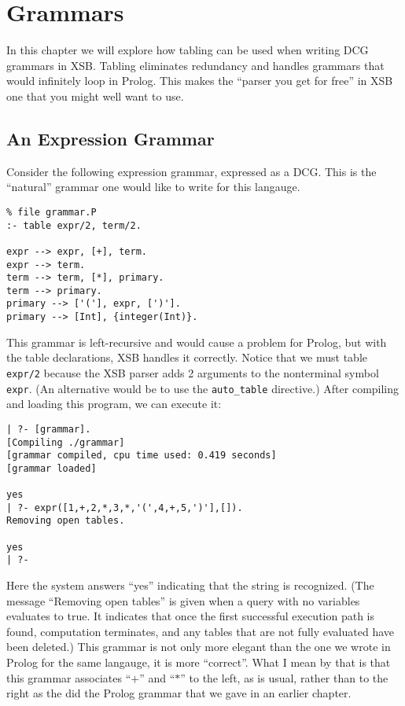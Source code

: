  \chapter{Grammars}

In this chapter we will explore how tabling can be used when writing
DCG grammars in XSB.  Tabling eliminates redundancy and handles
grammars that would infinitely loop in Prolog.  This makes the
``parser you get for free'' in XSB one that you might well want to
use.

\section{An Expression Grammar}

Consider the following expression grammar, expressed as a DCG.  This
is the ``natural'' grammar one would like to write for this langauge.
\begin{verbatim}
% file grammar.P
:- table expr/2, term/2.

expr --> expr, [+], term.
expr --> term.
term --> term, [*], primary.
term --> primary.
primary --> ['('], expr, [')'].
primary --> [Int], {integer(Int)}.
\end{verbatim}
This grammar is left-recursive and would cause a problem for Prolog,
but with the table declarations, XSB handles it correctly.  Notice
that we must table \verb|expr/2| because the XSB parser adds 2
arguments to the nonterminal symbol \verb|expr|.  (An alternative
would be to use the \verb|auto_table| directive.) After compiling and
loading this program, we can execute it:
\begin{verbatim}
| ?- [grammar].
[Compiling ./grammar]
[grammar compiled, cpu time used: 0.419 seconds]
[grammar loaded]

yes
| ?- expr([1,+,2,*,3,*,'(',4,+,5,')'],[]).
Removing open tables.

yes
| ?- 
\end{verbatim}
Here the system answers ``yes'' indicating that the string is
recognized.  (The message ``Removing open tables'' is given when a
query with no variables evaluates to true.  It indicates that once the
first successful execution path is found, computation terminates, and
any tables that are not fully evaluated have been deleted.)  This
grammar is not only more elegant than the one we wrote in Prolog for
the same langauge, it is more ``correct''.  What I mean by that is
that this grammar associates ``$+$'' and ``$*$'' to the left, as is
usual, rather than to the right as the did the Prolog grammar that we
gave in an earlier chapter.

